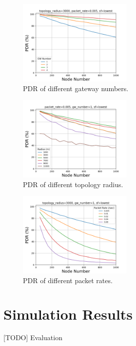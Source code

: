 \documentclass[conference]{IEEEtran}
\begin{document}
\begin{figure}
\centering
\includegraphics[width=0.5\textwidth]{gw_pdr}
\caption{PDR of different gateway numbers.}
\label{fig:gw_pdr}
\end{figure}

\begin{figure}
\centering
\includegraphics[width=0.5\textwidth]{r_pdr}
\caption{PDR of different topology radius.}
\label{fig:r_pdr}
\end{figure}

\begin{figure}
\centering
\includegraphics[width=0.5\textwidth]{pr_pdr}
\caption{PDR of different packet rates.}
\label{fig:pr_pdr}
\end{figure}


\section{Simulation Results} \label{Simulation Results}
[TODO] Evaluation
\end{document}
